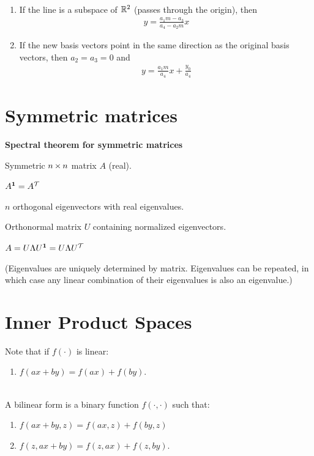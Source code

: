 \begin{example*}~\\
  \begin{enumerate}
  \item If the line is a subspace of $\mathbb{R}^2$ (passes through the origin), then
    \begin{align*}
      y = \frac{a_1m - a_3}{a_4 - a_2m}x
    \end{align*}
  \item If the new basis vectors point in the same direction as the original basis vectors, then
    $a_2 = a_3 = 0$ and
    \begin{align*}
      y = \frac{a_1m}{a_4}x + \frac{y_0}{a_4}
    \end{align*}
  \end{enumerate}
\end{example*}
\newpage
\section{Symmetric matrices}

\textbf{Spectral theorem for symmetric matrices}

Symmetric $n \operatorname{\times} n$ matrix $A$ (real).

$A^{\mathbf 1} = A^\mathcal T$

$n$ orthogonal eigenvectors with real eigenvalues.

Orthonormal matrix $U$ containing normalized eigenvectors.

$A = U\Lambda U^{\mathbf 1} = U\Lambda U^\mathcal T$

(Eigenvalues are uniquely determined by matrix. Eigenvalues can be repeated, in which case any linear combination of their
eigenvalues is also an eigenvalue.)

\section{Inner Product Spaces}

Note that if $f(\cdot)$ is linear:
\begin{enumerate}
\item $f(ax + by) = f(ax) + f(by)$.
\end{enumerate}

\begin{definition*}~\\
  A bilinear form is a binary function $f(\cdot, \cdot)$ such that:
  \begin{enumerate}
  \item $f(ax + by, z) = f(ax, z) + f(by, z)$
  \item $f(z, ax + by) = f(z, ax) + f(z, by)$.
  \end{enumerate}
\end{definition*}


